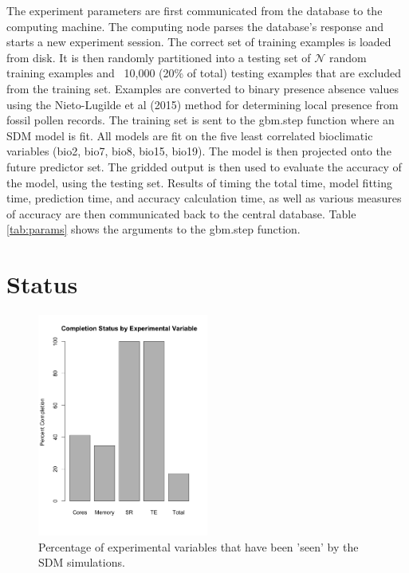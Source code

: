 \documentclass[a4paper]{article}
\begin{document}
The experiment parameters are first communicated from the database to the computing machine.  The computing node parses the database's response and starts a new experiment session.  The correct set of training examples is loaded from disk.  It is then randomly partitioned into a testing set of $\mathcal{N}$ random training examples and ~10,000 (20\% of total) testing examples that are excluded from the training set.  Examples are converted to binary presence absence values using the Nieto-Lugilde et al (2015) method for determining local presence from fossil pollen records.  The training set is sent to the gbm.step function where an SDM model is fit.  All models are fit on the five least correlated bioclimatic variables (bio2, bio7, bio8, bio15, bio19). The model is then projected onto the future predictor set.  The gridded output is then used to evaluate the accuracy of the model, using the testing set. Results of timing the total time, model fitting time, prediction time, and accuracy calculation time, as well as various measures of accuracy are then communicated back to the central database. Table \ref{tab:params} shows the arguments to the gbm.step function.

\section{Status}

\begin{figure}
\centering
\includegraphics[width=0.5\textwidth]{CompletionByType.png}
\caption{\label{fig:experimentByCategory}Percentage of experimental variables that have been 'seen' by the SDM simulations.}
\end{figure}
\end{document}
